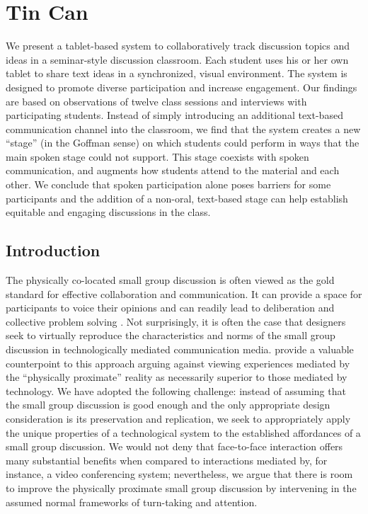 \chapter{Tin Can}
\label{ch:tincan}

We present a tablet-based system to collaboratively track discussion topics and ideas in a seminar-style discussion classroom. Each student uses his or her own tablet to share text ideas in a synchronized, visual environment. The system is designed to promote diverse participation and increase engagement. Our findings are based on observations of twelve class sessions and interviews with participating students. Instead of simply introducing an additional text-based communication channel into the classroom, we find that the system creates a new ``stage'' (in the Goffman sense) on which students could perform in ways that the main spoken stage could not support. This stage coexists with spoken communication, and augments how students attend to the material and each other. We conclude that spoken participation alone poses barriers for some participants and the addition of a non-oral, text-based stage can help establish equitable and engaging discussions in the class.



\section{Introduction}

The physically co-located small group discussion is often viewed as the gold standard for effective collaboration and communication.  It can provide a space for participants to voice their opinions and can readily lead to deliberation and collective problem solving \citep{Burkhalter:2002vg}. Not surprisingly, it is often the case that designers seek to virtually reproduce the characteristics and norms of the small group discussion in technologically mediated communication media. \citet{Hollan:1992tz} provide a valuable counterpoint to this approach arguing against viewing experiences mediated by the ``physically proximate'' reality as necessarily superior to those mediated by technology. We have adopted the following challenge: instead of assuming that the small group discussion is good enough and the only appropriate design consideration is its preservation and replication, we seek to appropriately apply the unique properties of a technological system to the established affordances of a small group discussion. We would not deny that face-to-face interaction offers many substantial benefits when compared to interactions mediated by, for instance, a video conferencing system; nevertheless, we argue that there is room to improve the physically proximate small group discussion by intervening in the assumed normal frameworks of turn-taking and attention.

